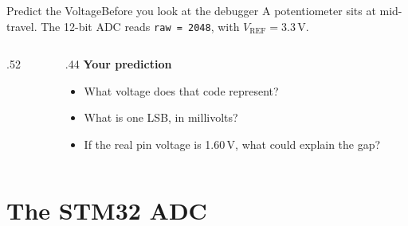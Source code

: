 \documentclass[9pt,aspectratio=169,xcolor=table]{beamer}
\begin{document}
{\beamerextras
\begin{frame}[fragile]{Predict the Voltage}{Before you look at the debugger}
    \leavevmode
    A potentiometer sits at mid-travel. The 12-bit ADC reads \texttt{raw = 2048}, with $V_{\text{REF}} = 3.3$\,V.

    \vspace{2mm}
    \begin{columns}[T]
    \begin{column}{.52\textwidth}
    \end{column}
    \begin{column}{.44\textwidth}
        \textbf{Your prediction}
        {\small
        \begin{itemize}\itemsep2pt
            \item What voltage does that code represent?
            \item What is one LSB, in millivolts?
            \item If the real pin voltage is 1.60\,V, what could explain the gap?
        \end{itemize}}
    \end{column}
    \end{columns}

    \vspace{2mm}
\end{frame}
}


\section{The STM32 ADC}
\end{document}
